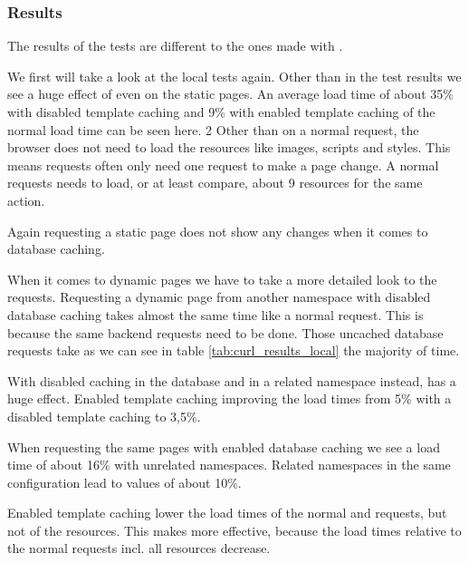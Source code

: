 \subsubsection{Results}

The results of the \selenium{} \webdriver{} tests are different to the ones made with \curl{}.

We first will take a look at the local tests again.
Other than in the \curl{} test results we see a huge effect of \lare{} even on the static pages.
An average \lare{} load time of about 35\% with disabled template caching and 9\% with enabled template caching of the normal load time can be seen here.   2
Other than on a normal request, the browser does not need to load the resources like images, scripts and styles.
This means \lare{} requests often only need one request to make a page change.
A normal requests needs to load, or at least compare, about 9 resources for the same action.

Again requesting a static page does not show any changes when it comes to database caching.

When it comes to dynamic pages we have to take a more detailed look to the requests.
Requesting a dynamic page from another \lare{} namespace with disabled database caching takes almost the same time like a normal request.
This is because the same backend requests need to be done.
Those uncached database requests take as we can see in table \ref{tab:curl_results_local} the majority of time.

With disabled caching in the database and in a related namespace instead, \lare{} has a huge effect.
Enabled template caching improving the load times from 5\% with a disabled template caching to 3,5\%.

When requesting the same pages with enabled database caching we see a \lare{} load time of about 16\% with unrelated namespaces.
Related namespaces in the same configuration lead to values of about 10\%.

Enabled template caching lower the load times of the normal and \lare{} requests, but not of the resources.
This makes \lare{} more effective, because the load times relative to the normal requests incl. all resources decrease.


